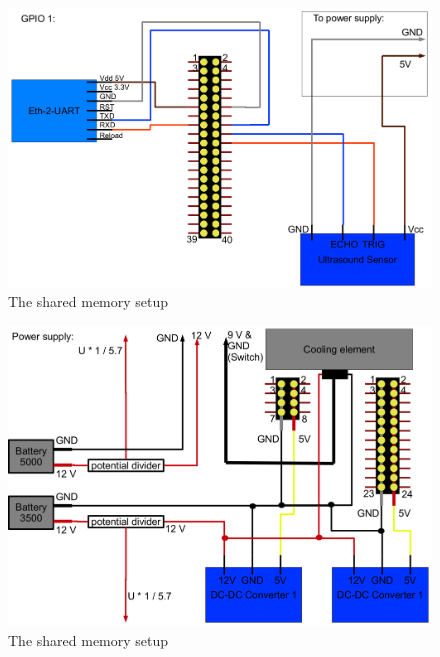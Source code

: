 \begin{figure}[h]\label{appendix:pic_circuits_nano_gpio1}
  \caption{The shared memory setup}
  \centering
    \includegraphics[width=1.0\textwidth]{figures/wiring_nano_gpio1.png}
\end{figure}

\begin{figure}[h]\label{appendix:pic_circuits_power_supply}
  \caption{The shared memory setup}
  \centering
    \includegraphics[width=1.0\textwidth]{figures/wiring_power_supply.png}
\end{figure}

